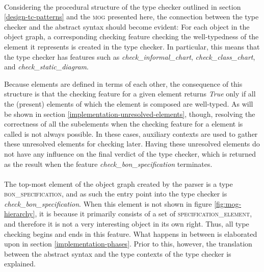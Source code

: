 \paragraph{}
Considering the procedural structure of the type checker outlined in section \ref{design-tc-patterns} and the \textsc{mog} presented here, the connection between the type checker and the abstract syntax should become evident: For each object in the object graph, a corresponding checking feature checking the well-typedness of the \bon{} element it represents is created in the type checker. In particular, this means that the type checker has features such as \textit{check\_informal\_chart}, \textit{check\_class\_chart}, and \textit{check\_static\_diagram}.

Because \bon{} elements are defined in terms of each other, the consequence of this structure is that the checking feature for a given \bon{} element returns \textit{True} only if all the (present) elements of which the element is composed are well-typed. As will be shown in section \ref{implementation-unresolved-elements}, though, resolving the correctness of all the subelements when the checking feature for a \bon{} element is called is not always possible. In these cases, auxiliary contexts are used to gather these unresolved \bon{} elements for checking later. Having these unresolved elements do not have any influence on the final verdict of the type checker, which is returned as the result when the feature \textit{check\_bon\_specification} terminates.
\paragraph{}
The top-most element of the object graph created by the parser is a type \textsc{bon\_specification}, and as such the entry point into the type checker is \textit{check\_bon\_specification}. When this element is not shown in figure \ref{fig:mog-hierarchy}, it is because it primarily consists of a set of \textsc{specification\_element}, and therefore it is not a very interesting object in its own right. Thus, all type checking begins and ends in this feature. What happens in between is elaborated upon in section \ref{implementation-phases}. Prior to this, however, the translation between the abstract syntax and the type contexts of the type checker is explained.

